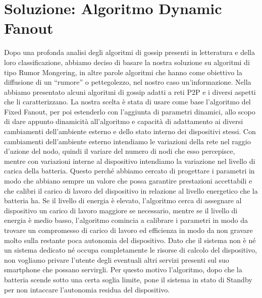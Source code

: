 \section{Soluzione: Algoritmo Dynamic Fanout}
Dopo una profonda analisi degli algoritmi di gossip presenti in letteratura e della loro classificazione, abbiamo deciso di basare la nostra soluzione su algoritmi di tipo Rumor Mongering, in altre parole algoritmi che hanno come obiettivo la diffusione di un “rumore” o pettegolezzo, nel nostro caso un'informazione. Nella  abbiamo presentato alcuni algoritmi di gossip adatti a reti \acs{P2P} e i diversi aspetti che li caratterizzano. La nostra scelta è stata di usare come base l'algoritmo del Fixed Fanout, per poi estenderlo con l'aggiunta di parametri dinamici, allo scopo di dare appunto dinamicità all'algoritmo e capacità di adattamento ai diversi cambiamenti dell'ambiente esterno e dello stato interno dei dispositivi stessi. Con cambiamenti dell'ambiente esterno intendiamo le variazioni della rete nel raggio d'azione del nodo, quindi il variare del numero di nodi che esso percepisce, mentre con variazioni interne al dispositivo intendiamo la variazione nel livello di carica della batteria. Questo perché abbiamo cercato di progettare i parametri in modo che abbiano sempre un valore che possa garantire prestazioni accettabili e che calibri il carico di lavoro del dispositivo in relazione al livello energetico che la batteria ha. Se il livello di energia è elevato, l'algoritmo cerca di assegnare al dispositivo un carico di lavoro maggiore se necessario, mentre se il livello di energia è medio basso, l'algoritmo comincia a calibrare i parametri in modo da trovare un compromesso di carico di lavoro ed efficienza in modo da non gravare molto sulla restante poca autonomia del dispositivo. Dato che il sistema non è né un sistema dedicato né occupa completamente le risorse di calcolo del dispositivo, non vogliamo privare l'utente degli eventuali altri servizi presenti sul suo smartphone che possano servirgli. Per questo motivo l'algoritmo, dopo che la batteria scende sotto una certa soglia limite, pone il sistema in stato di Standby per non intaccare l'autonomia residua del dispositivo.

